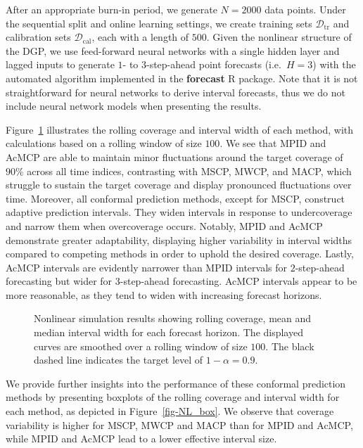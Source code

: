 \documentclass[
  11pt,
  a4paper,
]{article}
\theoremstyle{plain}
\theoremstyle{remark}
\begin{document}
After an appropriate burn-in period, we generate \(N=2000\) data points.
Under the sequential split and online learning settings, we create
training sets \(\mathcal{D}_{\text{tr}}\) and calibration sets
\(\mathcal{D}_{\text{cal}}\), each with a length of \(500\). Given the
nonlinear structure of the DGP, we use feed-forward neural networks with
a single hidden layer and lagged inputs to generate \(1\)- to
\(3\)-step-ahead point forecasts (i.e.~\(H=3\)) with the automated
algorithm implemented in the \textbf{forecast} R package. Note that it
is not straightforward for neural networks to derive interval forecasts,
thus we do not include neural network models when presenting the
results.

Figure~\ref{fig-NL_cov} illustrates the rolling coverage and interval
width of each method, with calculations based on a rolling window of
size \(100\). We see that MPID and AcMCP are able to maintain minor
fluctuations around the target coverage of \(90\%\) across all time
indices, contrasting with MSCP, MWCP, and MACP, which struggle to
sustain the target coverage and display pronounced fluctuations over
time. Moreover, all conformal prediction methods, except for MSCP,
construct adaptive prediction intervals. They widen intervals in
response to undercoverage and narrow them when overcoverage occurs.
Notably, MPID and AcMCP demonstrate greater adaptability, displaying
higher variability in interval widths compared to competing methods in
order to uphold the desired coverage. Lastly, AcMCP intervals are
evidently narrower than MPID intervals for \(2\)-step-ahead forecasting
but wider for \(3\)-step-ahead forecasting. AcMCP intervals appear to be
more reasonable, as they tend to widen with increasing forecast
horizons.

\begin{figure}


\caption{\label{fig-NL_cov}Nonlinear simulation results showing rolling
coverage, mean and median interval width for each forecast horizon. The
displayed curves are smoothed over a rolling window of size \(100\). The
black dashed line indicates the target level of \(1-\alpha=0.9\).}

\end{figure}%

We provide further insights into the performance of these conformal
prediction methods by presenting boxplots of the rolling coverage and
interval width for each method, as depicted in Figure~\ref{fig-NL_box}.
We observe that coverage variability is higher for MSCP, MWCP and MACP
than for MPID and AcMCP, while MPID and AcMCP lead to a lower effective
interval size.
\end{document}
